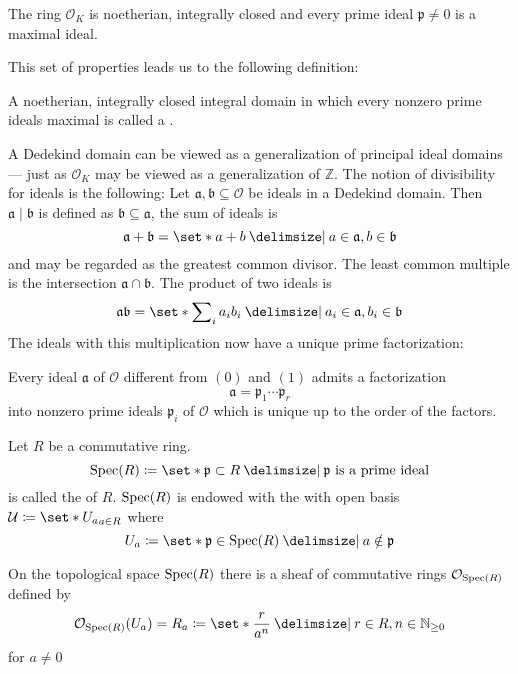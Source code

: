 \begin{theorem}[{name={\cite[Thm.~3.1]{neukirch}}}]
	The ring $\mathcal{O}_K$ is noetherian, integrally closed and every prime ideal $\mathfrak{p} \neq 0$ is a maximal ideal.
\end{theorem}

This set of properties leads us to the following definition:

\begin{definition}[{name=[Dedekind domain]}]
	A noetherian, integrally closed integral domain in which every nonzero prime ideals maximal is called a .
\end{definition}

A Dedekind domain can be viewed as a generalization of principal ideal domains --- just as $\mathcal{O}_K$ may be viewed as a generalization of $\mathbb{Z}$.
The notion of divisibility for ideals is the following: Let $\mathfrak{a}, \mathfrak{b} \subseteq \mathcal{O}$ be ideals in a Dedekind domain.
Then $\mathfrak{a} \mid \mathfrak{b}$ is defined as $\mathfrak{b} \subseteq \mathfrak{a}$, the sum of ideals is
\[
	\mathfrak{a} + \mathfrak{b} = \set*{a + b \given a \in \mathfrak{a}, b \in \mathfrak{b}}
\]
and may be regarded as the greatest common divisor.
The least common multiple is the intersection $\mathfrak{a} \cap \mathfrak{b}$.
The product of two ideals is
\[
	\mathfrak{a} \mathfrak{b} = \set*{\sum\nolimits_i a_i b_i \given a_i \in \mathfrak{a}, b_i \in \mathfrak{b}}
\]
The ideals with this multiplication now have a unique prime factorization:

\begin{theorem}[{name={\cite[Thm.~3.3]{neukirch}}}]
	Every ideal $\mathfrak{a}$ of $\mathcal{O}$ different from $(0)$ and $(1)$ admits a factorization
	\[
		\mathfrak{a} = \mathfrak{p}_1 \cdots \mathfrak{p}_r
	\]
	into nonzero prime ideals $\mathfrak{p}_i$ of $\mathcal{O}$ which is unique up to the order of the factors.
\end{theorem}




\begin{definition}[{name=[prime spectrum]}]
	Let $R$ be a commutative ring.
	\[
		\Spec(R) \coloneqq \set*{\mathfrak{p} \subset R \given \mathfrak{p} \text{ is a prime ideal} }
	\]
	is called the  of $R$.
	$\operatorname{Spec}(R)$ is endowed with the  with open basis $\mathcal{U} \coloneqq \set*{U_a}_{a \in R}$ where
	\[
		U_a \coloneqq \set*{\mathfrak{p} \in \Spec(R) \given a \notin \mathfrak{p}}
	\]
\end{definition}

On the topological space $\operatorname{Spec}(R)$ there is a sheaf of commutative rings $\mathcal{O}_{\operatorname{Spec}(R)}$ defined by
\[
	\mathcal{O}_{\Spec(R)}(U_a) = R_a \coloneqq \set*{\frac{r}{a^n} \given r \in R, n \in \mathbb{N}_{\ge 0}}
\]
for $a \neq 0$



\cleardoubleoddemptypage%
\setcounter{page}{1}
\appendix%
\printbibliography%
\printindex%
\todototoc%
\listoftodos[To-do's]

